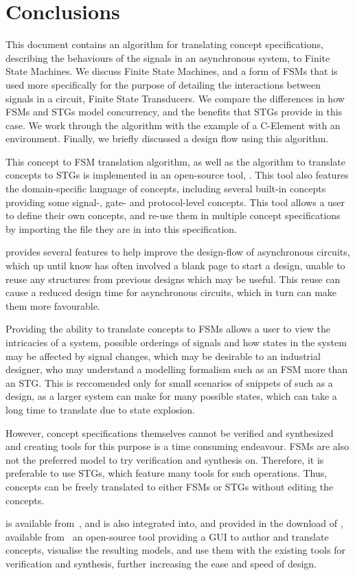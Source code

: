 \section {Conclusions \label {sec:conclusions}}

This document contains an algorithm for translating concept specifications,
describing the behaviours of the signals in an asynchronous system, to Finite
State Machines. We discuss Finite State Machines, and a form of FSMs that is 
used more specifically for the purpose of detailing the interactions between 
signals in a circuit, Finite State Transducers. We compare the differences in how
FSMs and STGs model concurrency, and the benefits that STGs provide in this 
case. We work through the algorithm with the example of a C-Element with an 
environment. Finally, we briefly discussed a design flow using this algorithm. 

This concept to FSM translation algorithm, as well as the algorithm to translate 
concepts to STGs is implemented in an open-source tool, . This tool 
also features the domain-specific language of concepts, including several built-in 
concepts providing some signal-, gate- and protocol-level concepts. This tool 
allows a user to define their own concepts, and re-use them in multiple concept 
specifications by importing the file they are in into this specification. 

 provides several features to help improve the design-flow of 
asynchronous circuits, which up until know has often involved a blank page to 
start a design, unable to reuse any structures from previous designs which may 
be useful. This reuse can cause a reduced design time for asynchronous circuits, 
which in turn can make them more favourable. 

Providing the ability to translate concepts to FSMs allows a user to view the 
intricacies of a system, possible orderings of signals and how states in the 
system may be affected by signal changes, which may be desirable to an 
industrial designer, who may understand a modelling formalism such as an FSM
more than an STG. This is reccomended only for small scenarios of snippets of 
such as a design, as a larger system can make for many possible states, which 
can take a long time to translate due to state explosion. 

However, concept specifications themselves cannot be verified and synthesized 
and creating tools for this purpose is a time consuming endeavour. 
FSMs are also not the preferred model to try verification and synthesis on. 
Therefore, it is preferable to use STGs, which feature many tools for 
such operations. Thus, concepts can be freely translated to either FSMs or STGs
without editing the concepts. 

 is available from~\cite{2017_plato_github}, and is also integrated 
into, and provided in the download of , available 
from~\cite{Workcraft_website} an open-source tool 
providing a GUI to author and translate concepts, visualise the resulting models, 
and use them with the existing tools for verification and synthesis, further 
increasing the ease and speed of design.
